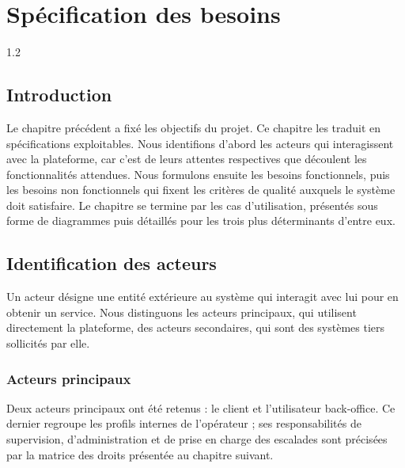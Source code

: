 \chapter{Spécification des besoins}

\begin{spacing}{1.2}
\minitoc
\thispagestyle{MyStyle}
\end{spacing}
\newpage

\section*{Introduction}

Le chapitre précédent a fixé les objectifs du projet. Ce chapitre les traduit en spécifications exploitables. Nous identifions d'abord les acteurs qui interagissent avec la plateforme, car c'est de leurs attentes respectives que découlent les fonctionnalités attendues. Nous formulons ensuite les besoins fonctionnels, puis les besoins non fonctionnels qui fixent les critères de qualité auxquels le système doit satisfaire. Le chapitre se termine par les cas d'utilisation, présentés sous forme de diagrammes puis détaillés pour les trois plus déterminants d'entre eux.

\section{Identification des acteurs}

Un acteur désigne une entité extérieure au système qui interagit avec lui pour en obtenir un service. Nous distinguons les acteurs principaux, qui utilisent directement la plateforme, des acteurs secondaires, qui sont des systèmes tiers sollicités par elle.

\subsection{Acteurs principaux}

Deux acteurs principaux ont été retenus : le client et l'utilisateur back-office. Ce dernier regroupe les profils internes de l'opérateur ; ses responsabilités de supervision, d'administration et de prise en charge des escalades sont précisées par la matrice des droits présentée au chapitre suivant.

